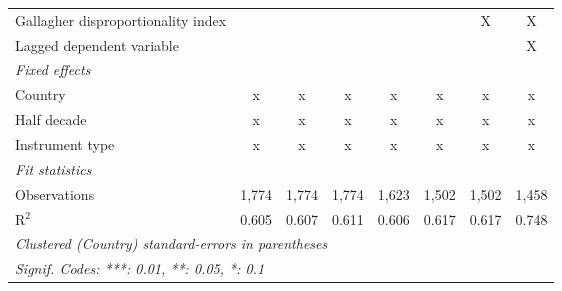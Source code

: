 \begin{tabular}{lccccccc}
   Gallagher disproportionality index                                  &         &         &         &              &               & X             & X\\  
   Lagged dependent variable                                           &         &         &         &              &               &               & X\\  
   \emph{Fixed effects}\\
   Country                                                             & x       & x       & x       & x            & x             & x             & x\\  
   Half decade                                                         & x       & x       & x       & x            & x             & x             & x\\  
   Instrument type                                                     & x       & x       & x       & x            & x             & x             & x\\  
   \midrule \emph{Fit statistics}\\
   Observations                                                        & 1,774   & 1,774   & 1,774   & 1,623        & 1,502         & 1,502         & 1,458\\  
   R$^2$                                                               & 0.605   & 0.607   & 0.611   & 0.606        & 0.617         & 0.617         & 0.748\\  
   \midrule
   \multicolumn{8}{l}{\emph{Clustered (Country) standard-errors in parentheses}}\\
   \multicolumn{8}{l}{\emph{Signif. Codes: ***: 0.01, **: 0.05, *: 0.1}}\\
\end{tabular}
\par\endgroup


